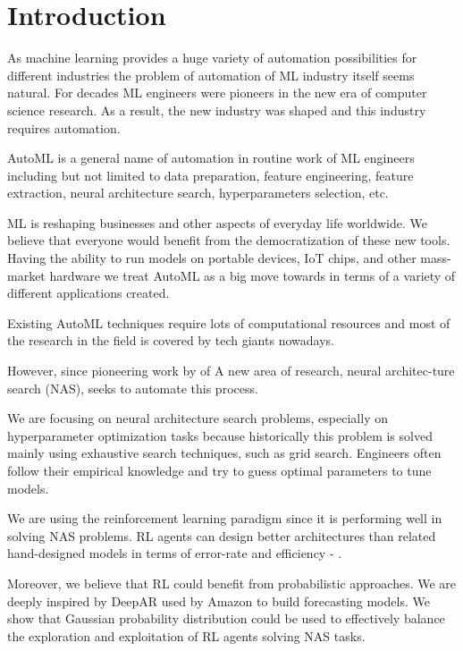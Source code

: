 \chapter{Introduction}

As machine learning provides a huge variety of automation possibilities for different industries the problem of automation of ML industry itself seems natural. For decades ML engineers were pioneers in the new era of computer science research. As a result, the new industry was shaped and this industry requires automation.

AutoML is a general name of automation in routine work of ML engineers including but not limited to data preparation, feature engineering, feature extraction, neural architecture search, hyperparameters selection, etc.

ML is reshaping businesses and other aspects of everyday life worldwide. We believe that everyone would benefit from the democratization of these new tools. Having the ability to run models on portable devices, IoT chips, and other mass-market hardware we treat AutoML as a big move towards in terms of a variety of different applications created.


Existing AutoML techniques require lots of computational resources and most of the research in the field is covered by tech giants nowadays. 

However, since pioneering work by  of A new area of research, neural architec-ture search (NAS), seeks to automate this process.

We are focusing on neural architecture search problems, especially on hyperparameter optimization tasks because historically this problem is solved mainly using exhaustive search techniques, such as grid search. Engineers often follow their empirical knowledge and try to guess optimal parameters to tune models.

We are using the reinforcement learning paradigm since it is performing well in solving NAS problems. RL agents can design better architectures than related hand-designed models in terms of error-rate and efficiency - \cite[see][]{ZophL16}.

Moreover, we believe that RL could benefit from probabilistic approaches. We are deeply inspired by DeepAR \cite[][]{2017arXiv170404110S} used by Amazon to build forecasting models. We show that Gaussian probability distribution could be used to effectively balance the exploration and exploitation of RL agents solving NAS tasks.

\endinput